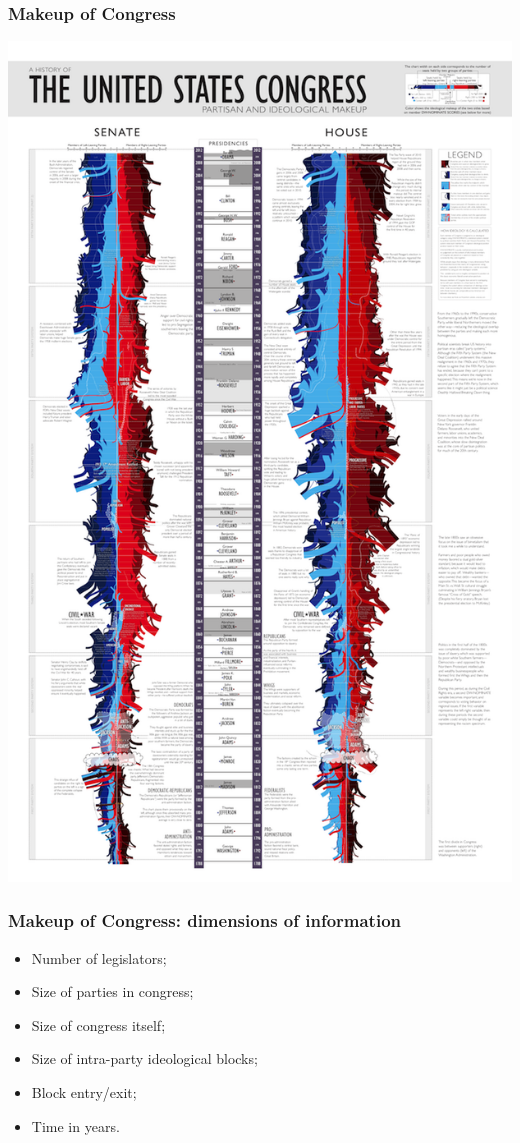 \documentclass[aspectratio=169]{beamer}
\theoremstyle{principle}
\begin{document}
\begin{frame}
\frametitle{Makeup of Congress}
\begin{center}
\includegraphics[scale=0.18]{congress.png}
\end{center}

\end{frame}

\begin{frame}
\frametitle{Makeup of Congress: dimensions of information}

\begin{itemize}
\item Number of legislators;
\bigskip
\item Size of parties in congress;
\bigskip
\item Size of congress itself;
\bigskip
\item Size of intra-party ideological blocks;
\bigskip
\item Block entry/exit;
\bigskip
\item Time in years.
\end{itemize}

\end{frame}
\end{document}
